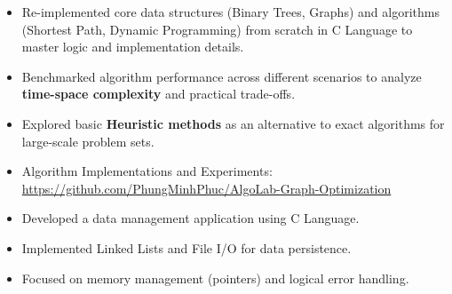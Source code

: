 \documentclass[12 pt,a4paper,ragged2e]{altacv}
\begin{document}
\divider




\begin{itemize}
  \item Re-implemented core data structures (Binary Trees, Graphs) and algorithms (Shortest Path, Dynamic Programming) from scratch in C Language to master logic and implementation details.
  \item Benchmarked algorithm performance across different scenarios to analyze \textbf{time-space complexity} and practical trade-offs.
  \item Explored basic \textbf{Heuristic methods} as an alternative to exact algorithms for large-scale problem sets.
  \item Algorithm Implementations and Experiments:\\ \footnotesize\href{https://github.com/PhungMinhPhuc/AlgoLab-Graph-Optimization}{https://github.com/PhungMinhPhuc/AlgoLab-Graph-Optimization}
\end{itemize}

\divider

\begin{itemize}
\item Developed a data management application using C Language.
\item Implemented Linked Lists and File I/O for data persistence.
\item Focused on memory management (pointers) and logical error handling.
\end{itemize}








\end{document}
